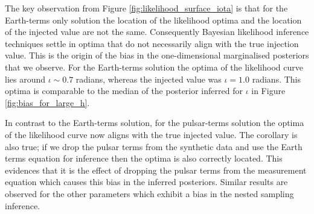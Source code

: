 \documentclass[fleqn,usenatbib,useAMS]{mnras}
\begin{document}
The key observation from Figure \ref{fig:likelihood_surface_iota} is that for the Earth-terms only solution the location of the likelihood optima and the location of the injected value are not the same. Consequently Bayesian likelihood inference techniques settle in optima that do not necessarily align with the true injection value. This is the origin of the bias in the one-dimensional marginalised posteriors that we observe.  For the Earth-terms solution the optima of the likelihood curve lies around $\iota \sim 0.7$ radians, whereas the injected value was $\iota = 1.0$ radians. This optima is comparable to the median of the posterior inferred for $\iota$ in Figure \ref{fig:bias_for_large_h}. \newline 


In contrast to the Earth-terms solution, for the pulsar-terms solution the optima of the likelihood curve now aligns with the true injected value. The corollary is also true; if we drop the pulsar terms from the synthetic data and use the Earth terms equation for inference then the optima is also correctly located. This evidences that it is the effect of dropping the pulsar terms from the measurement equation which causes this bias in the inferred posteriors. Similar results are observed for the other parameters which exhibit a bias in the nested sampling inference. \newline 
\end{document}
